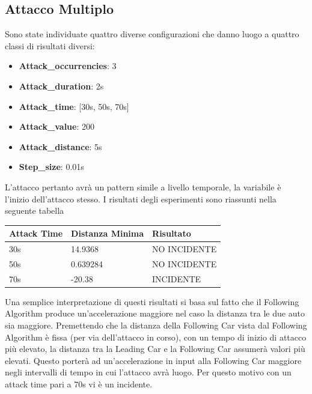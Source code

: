 \subsection{Attacco Multiplo}
Sono state individuate quattro diverse configurazioni che danno luogo a quattro classi di risultati diversi:
\begin{itemize}
	\item \textbf{Attack\_occurrencies}: 3
	\item \textbf{Attack\_duration}: 2s
	\item \textbf{Attack\_time}: [30s, 50s, 70s]
	\item \textbf{Attack\_value}: 200
	\item \textbf{Attack\_distance}: 5s
	\item \textbf{Step\_size}: 0.01s
\end{itemize}
L'attacco pertanto avrà un pattern simile a livello temporale, la variabile è l'inizio dell'attacco stesso. I risultati degli esperimenti sono riassunti nella seguente tabella
\renewcommand{\arraystretch}{1.5}
\begin{center}
	\begin{tabular}{ |p{4cm}|p{5cm}| p{4cm}|  }
		\hline
		Attack Time & Distanza Minima & Risultato \\
		\hline
		30s & 14.9368 & NO INCIDENTE \\
		\hline
		50s & 0.639284 & NO INCIDENTE \\
		\hline
		70s & -20.38 & INCIDENTE \\
		\hline
	\end{tabular}
\end{center}
Una semplice interpretazione di questi risultati si basa sul fatto che il Following Algorithm produce un'accelerazione maggiore nel caso la distanza tra le due auto sia maggiore. Premettendo che la distanza della Following Car vista dal Following Algorithm è fissa (per via dell'attacco in corso), con un tempo di inizio di attacco più elevato, la distanza tra la Leading Car e la Following Car assumerà valori più elevati. Questo porterà ad un'accelerazione in input alla Following Car maggiore negli intervalli di tempo in cui l'attacco avrà luogo. Per questo motivo con un attack time pari a 70s vi è un incidente.